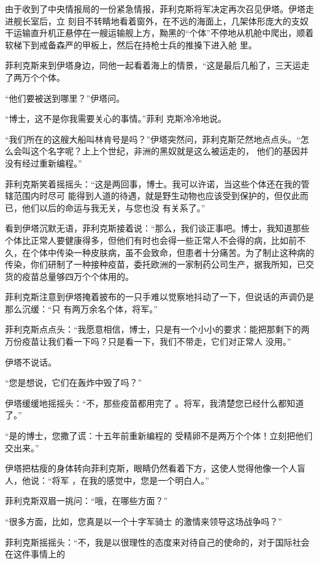 \documentclass{article}
\begin{document}
由于收到了中央情报局的一份紧急情报，菲利克斯将军决定再次召见伊塔。伊塔走进舰长室后，立
\newpage
刻目不转睛地看着窗外，在不远的海面上，几架体形庞大的支奴干运输直升机正悬停在一艘运输舰上方，黝黑的“个体”不停地从机舱中爬出，顺着软梯下到戒备森严的甲板上，然后在持枪士兵的推搡下进入舱
里。 

菲利克斯来到伊塔身边，同他一起看着海上的情景，“这是最后几船了，三天运走了两万个个体。


“他们要被送到哪里？”伊塔问。 

“博士，这不是你我需要关心的事情。”菲利
克斯冷冷地说。 

“我们所在的这艘大船叫林肯号是吗？”伊塔突然问，菲利克斯茫然地点点头。“怎么会叫这个名字呢？上上个世纪，非洲的黑奴就是这么被运走的，
他们的基因并没有经过重新编程。” 

菲利克斯笑着摇摇头：“这是两回事，博士。我可以许诺，当这些个体还在我的管辖范围内时尽可
\newpage
能得到人道的待遇，就是野生动物也应该受到保护的，但仅此而已，他们以后的命运与我无关，与您也没
有关系了。” 

看到伊塔沉默无语，菲利克斯接着说：“那么，我们谈正事吧。博士，我知道那些个体比正常人要健康得多，但他们有时也会得一些正常人不会得的病，比如前不久，在个体中传染一种皮肤病，虽不会致命，但患者十分痛苦。为了制止这种病的传染，你们研制了一种接种疫苗，委托欧洲的一家制药公司生产，据我所知，已交货的疫苗总量够四万个个体用的。

菲利克斯注意到伊塔掩着披布的一只手难以觉察地抖动了一下，但说话的声调仍是那么沉缓：“只
有两万余名个体，将军。” 

菲利克斯点点头：“我愿意相信，博士，只是有一个小小的要求：能把那剩下的两万份疫苗让我们看一下吗？只是看一下，我们不带走，它们对正常人
没用。” 

\newpage


伊塔不说话。 


“您是想说，它们在轰炸中毁了吗？” 

伊塔缓缓地摇摇头：“不，那些疫苗都用完了
。将军，我清楚您已经什么都知道了。” 

“是的博士，您撒了谎：十五年前重新编程的
受精卵不是两万个个体！立刻把他们交出来。” 

伊塔把枯瘦的身体转向菲利克斯，眼睛仍然看着下方，这使人觉得他像一个人盲人，他说：“将军
，在我的感觉中，您是一个明白人。” 

菲利克斯双眉一挑问：“哦，在哪些方面？”

“很多方面，比如，您真是以一个十字军骑士
的激情来领导这场战争吗？” 

菲利克斯摇摇头：“不，我是以很理性的态度来对待自己的使命的，对于国际社会在这件事情上的
\newpage
\end{document}
